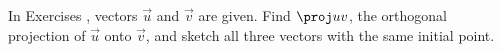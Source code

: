 {\noindent In Exercises}
{, vectors $\vec u$ and $\vec v$ are given. Find $\proj uv$, the orthogonal projection of $\vec u$ onto $\vec v$, and sketch all three vectors with the same initial point.
}
